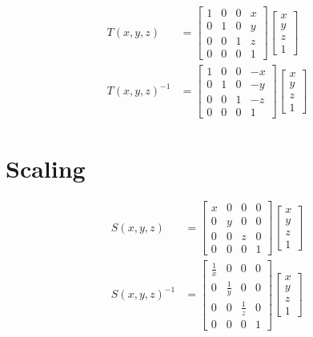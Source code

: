   \begin{align}
    T\left( x, y, z \right) &=
    \begin{bmatrix}
      1 & 0 & 0 & x \\
      0 & 1 & 0 & y \\
      0 & 0 & 1 & z \\
      0 & 0 & 0 & 1
    \end{bmatrix}
    \begin{bmatrix}
      x \\
      y \\
      z \\
      1
    \end{bmatrix} \\
    T\left( x, y, z \right)^{-1} &=
    \begin{bmatrix}
      1 & 0 & 0 & -x \\
      0 & 1 & 0 & -y \\
      0 & 0 & 1 & -z \\
      0 & 0 & 0 & 1
    \end{bmatrix}
    \begin{bmatrix}
      x \\
      y \\
      z \\
      1
    \end{bmatrix}
  \end{align}

\section{Scaling}

  \begin{align}
    S\left( x, y, z \right) &=
    \begin{bmatrix}
      x & 0 & 0 & 0 \\
      0 & y & 0 & 0 \\
      0 & 0 & z & 0 \\
      0 & 0 & 0 & 1
    \end{bmatrix}
    \begin{bmatrix}
      x \\
      y \\
      z \\
      1
    \end{bmatrix} \label{eq: affine-transformation-scale-bigger} \\
    S\left( x, y, z \right)^{-1} &=
    \begin{bmatrix}
      \frac{1}{x} & 0 & 0 & 0 \\
      0 & \frac{1}{y} & 0 & 0 \\
      0 & 0 & \frac{1}{z} & 0 \\
      0 & 0 & 0 & 1
    \end{bmatrix}
    \begin{bmatrix}
      x \\
      y \\
      z \\
      1
    \end{bmatrix}
  \end{align}

